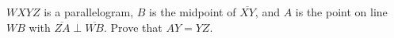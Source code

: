 $WXYZ$ is a parallelogram, $B$ is the midpoint of $\overline{XY}$, and $A$ is the point on line $WB$ with $\overline{ZA}\perp\overline{WB}$. Prove that $AY=YZ$.
